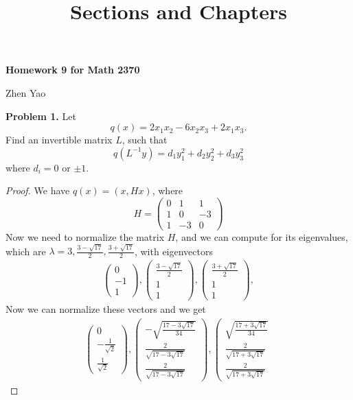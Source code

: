 \documentclass[12pt,leqno]{amsart}
\title{Sections and Chapters}
\theoremstyle{definition}
\begin{document}
\centerline{\bf Homework 9 for Math 2370}
\centerline{Zhen Yao}

\bigskip

\medskip

\noindent \textbf{Problem 1.} 
Let%
$$
q\left(  x\right)  =2x_{1}x_{2}-6x_{2}x_{3}+2x_{1}x_{3}.
$$
Find an invertible matrix $L$, such that%
$$
q\left(  L^{-1}y\right)  =d_{1}y_{1}^{2}+d_{2}y_{2}^{2}+d_{3}y_{3}^{2}%
$$
where $d_{i}=0$ or $\pm1$.
\begin{proof}
We have $q(x) = (x,Hx)$, where 
$$
H = \left(
\begin{matrix}
0 & 1 & 1\\
1 & 0 & -3\\
1 & -3 & 0
\end{matrix}
\right)
$$
Now we need to normalize the matrix $H$, and we can compute for its eigenvalues, which are $\lambda = 3, \frac{3-\sqrt{17}}{2}, \frac{3+\sqrt{17}}{2}$, with eigenvectors 
\begin{align*}
    \left(\begin{matrix} 0 \\ - 1\\ 1 
    \end{matrix}\right), 
    \left(\begin{matrix} \frac{3-\sqrt{17}}{2} \\ 1\\ 1 
    \end{matrix}\right), 
    \left(\begin{matrix} \frac{3+\sqrt{17}}{2} \\ 1\\ 1 
    \end{matrix}\right), 
\end{align*}
Now we can normalize these vectors and we get 
\begin{align*}
    \left(\begin{matrix} 0 \\ - \frac{1}{\sqrt{2}}\\ \frac{1}{\sqrt{2}} 
    \end{matrix}\right), 
    \left(\begin{matrix} -\sqrt{\frac{17-3\sqrt{17}}{34}} \\ \frac{2}{\sqrt{17-3\sqrt{17}}}\\ \frac{2}{\sqrt{17-3\sqrt{17}}} 
    \end{matrix}\right), 
    \left(\begin{matrix} \sqrt{\frac{17+3\sqrt{17}}{34}} \\ \frac{2}{\sqrt{17+3\sqrt{17}}} \\ \frac{2}{\sqrt{17+3\sqrt{17}}} 

\end{matrix}
\end{align*}
\end{proof}
\end{document}
